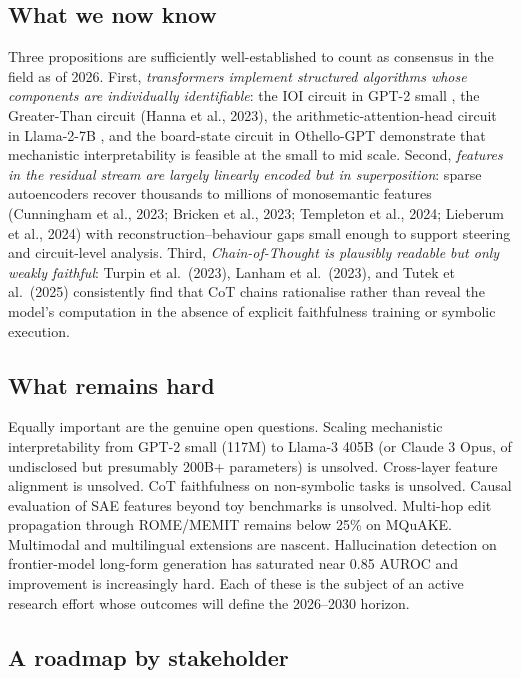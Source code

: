 \documentclass{article}
\begin{document}
\subsection{What we now know}\label{what-we-now-know}

Three propositions are sufficiently well-established to count as consensus in the field as of 2026. First, \emph{transformers implement structured algorithms whose components are individually identifiable}: the IOI circuit in GPT-2 small \citep{wang2022interpretabilityin}, the Greater-Than circuit (Hanna et al., 2023), the arithmetic-attention-head circuit in Llama-2-7B \citep{yu2024interpretingarithm}, and the board-state circuit in Othello-GPT \citep{li2024pmetprecisemodeled} demonstrate that mechanistic interpretability is feasible at the small to mid scale. Second, \emph{features in the residual stream are largely linearly encoded but in superposition}: sparse autoencoders recover thousands to millions of monosemantic features (Cunningham et al., 2023; Bricken et al., 2023; Templeton et al., 2024; Lieberum et al., 2024) with reconstruction--behaviour gaps small enough to support steering and circuit-level analysis. Third, \emph{Chain-of-Thought is plausibly readable but only weakly faithful}: Turpin et al.~(2023), Lanham et al.~(2023), and Tutek et al.~(2025) consistently find that CoT chains rationalise rather than reveal the model's computation in the absence of explicit faithfulness training or symbolic execution.

\subsection{What remains hard}\label{what-remains-hard}

Equally important are the genuine open questions. Scaling mechanistic interpretability from GPT-2 small (117M) to Llama-3 405B (or Claude 3 Opus, of undisclosed but presumably 200B+ parameters) is unsolved. Cross-layer feature alignment is unsolved. CoT faithfulness on non-symbolic tasks is unsolved. Causal evaluation of SAE features beyond toy benchmarks is unsolved. Multi-hop edit propagation through ROME/MEMIT remains below 25\% on MQuAKE. Multimodal and multilingual extensions are nascent. Hallucination detection on frontier-model long-form generation has saturated near 0.85 AUROC and improvement is increasingly hard. Each of these is the subject of an active research effort whose outcomes will define the 2026--2030 horizon.

\subsection{A roadmap by stakeholder}\label{a-roadmap-by-stakeholder}
\end{document}
